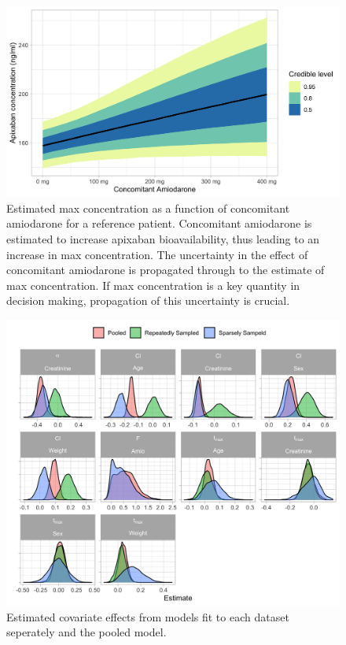 \begin{figure}
	
	{\centering \includegraphics[width=\linewidth]{figures/max-concentration-1} 
		
	}
	
	\caption{Estimated max concentration as a function of concomitant amiodarone for a reference patient.  Concomitant amiodarone is estimated to increase apixaban bioavailability, thus leading to an increase in max concentration. The uncertainty in the effect of concomitant amiodarone is propagated through to the estimate of max concentration.  If max concentration is a key quantity in decision making, propagation of this uncertainty is crucial.}\label{fig:max-concentration}
\end{figure}

\begin{figure}
	
	{\centering \includegraphics[width=\linewidth]{figures/effect-estimates-1} 
		
	}
	
	\caption{Estimated covariate effects from models fit to each dataset seperately and the pooled model.}\label{fig:effect-estimates}
\end{figure}
